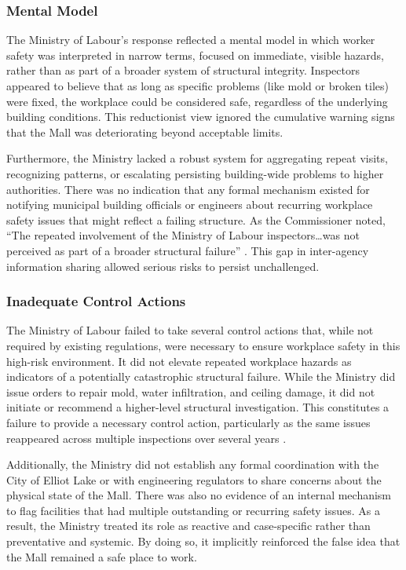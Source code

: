 \documentclass[12pt]{article}
\begin{document}
\subsubsection*{Mental Model}

The Ministry of Labour's response reflected a mental model in which worker safety was interpreted in narrow terms, focused on immediate, visible hazards, rather than as part of a broader system of structural integrity. Inspectors appeared to believe that as long as specific problems (like mold or broken tiles) were fixed, the workplace could be considered safe, regardless of the underlying building conditions. This reductionist view ignored the cumulative warning signs that the Mall was deteriorating beyond acceptable limits.

Furthermore, the Ministry lacked a robust system for aggregating repeat visits, recognizing patterns, or escalating persisting building-wide problems to higher authorities. There was no indication that any formal mechanism existed for notifying municipal building officials or engineers about recurring workplace safety issues that might reflect a failing structure. As the Commissioner noted, ``The repeated involvement of the Ministry of Labour inspectors…was not perceived as part of a broader structural failure'' \cite[p148]{AlgoLakeReport1}. This gap in inter-agency information sharing allowed serious risks to persist unchallenged.

\subsubsection*{Inadequate Control Actions}

The Ministry of Labour failed to take several control actions that, while not required by existing regulations, were necessary to ensure workplace safety in this high-risk environment. It did not elevate repeated workplace hazards as indicators of a potentially catastrophic structural failure. While the Ministry did issue orders to repair mold, water infiltration, and ceiling damage, it did not initiate or recommend a higher-level structural investigation. This constitutes a failure to provide a necessary control action, particularly as the same issues reappeared across multiple inspections over several years \cite[p145-149]{AlgoLakeReport1}.

Additionally, the Ministry did not establish any formal coordination with the City of Elliot Lake or with engineering regulators to share concerns about the physical state of the Mall. There was also no evidence of an internal mechanism to flag facilities that had multiple outstanding or recurring safety issues. As a result, the Ministry treated its role as reactive and case-specific rather than preventative and systemic. By doing so, it implicitly reinforced the false idea that the Mall remained a safe place to work.
\end{document}
